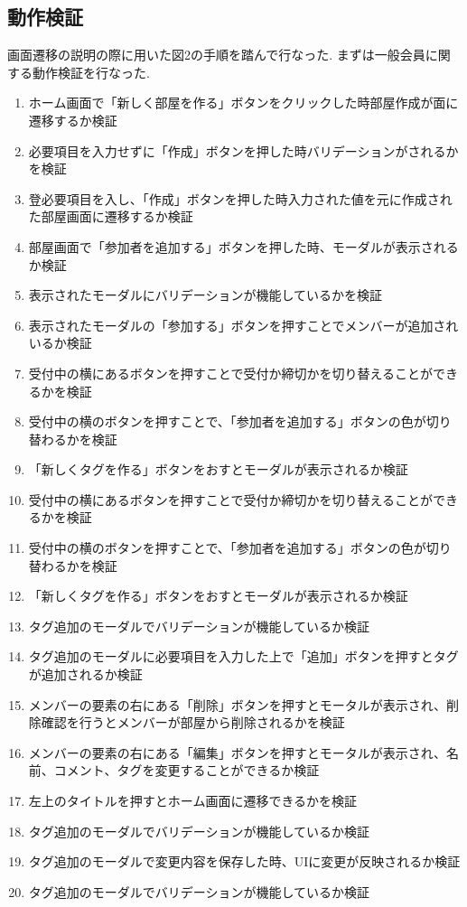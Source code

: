 \documentclass[submit,techrep]{ipsj}
\begin{document}
\subsection{動作検証}
画面遷移の説明の際に用いた図2の手順を踏んで行なった.
まずは一般会員に関する動作検証を行なった.
\begin{enumerate}
  \item ホーム画面で「新しく部屋を作る」ボタンをクリックした時部屋作成が面に遷移するか検証
  \item 必要項目を入力せずに「作成」ボタンを押した時バリデーションがされるかを検証
  \item 登必要項目を入し、「作成」ボタンを押した時入力された値を元に作成された部屋画面に遷移するか検証
  \item 部屋画面で「参加者を追加する」ボタンを押した時、モーダルが表示されるか検証
  \item 表示されたモーダルにバリデーションが機能しているかを検証
   \item 表示されたモーダルの「参加する」ボタンを押すことでメンバーが追加されいるか検証
  \item 受付中の横にあるボタンを押すことで受付か締切かを切り替えることができるかを検証
   \item 受付中の横のボタンを押すことで、「参加者を追加する」ボタンの色が切り替わるかを検証
  \item 「新しくタグを作る」ボタンをおすとモーダルが表示されるか検証
   \item 受付中の横にあるボタンを押すことで受付か締切かを切り替えることができるかを検証
   \item 受付中の横のボタンを押すことで、「参加者を追加する」ボタンの色が切り替わるかを検証
  \item 「新しくタグを作る」ボタンをおすとモーダルが表示されるか検証
   \item タグ追加のモーダルでバリデーションが機能しているか検証
   \item タグ追加のモーダルに必要項目を入力した上で「追加」ボタンを押すとタグが追加されるか検証
  \item メンバーの要素の右にある「削除」ボタンを押すとモータルが表示され、削除確認を行うとメンバーが部屋から削除されるかを検証
   \item メンバーの要素の右にある「編集」ボタンを押すとモータルが表示され、名前、コメント、タグを変更することができるか検証
    \item 左上のタイトルを押すとホーム画面に遷移できるかを検証
     \item タグ追加のモーダルでバリデーションが機能しているか検証
          \item タグ追加のモーダルで変更内容を保存した時、UIに変更が反映されるか検証
               \item タグ追加のモーダルでバリデーションが機能しているか検証
  \end{enumerate}
    
\end{document}
